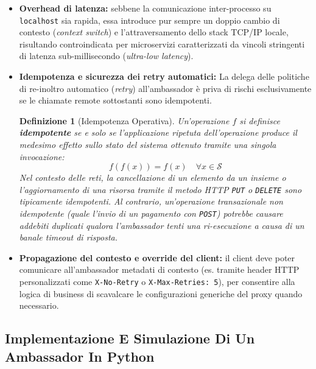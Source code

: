 \documentclass[11pt, a4paper]{article}
\newtheorem{theorem}{Definizione}
\begin{document}
\begin{itemize}[noitemsep]
    \item \textbf{Overhead di latenza:} sebbene la comunicazione inter-processo su \texttt{localhost} sia rapida, essa introduce pur sempre un doppio cambio di contesto (\emph{context switch}) e l'attraversamento dello stack TCP/IP locale, risultando controindicata per microservizi caratterizzati da vincoli stringenti di latenza sub-millisecondo (\emph{ultra-low latency}).
    \item \textbf{Idempotenza e sicurezza dei retry automatici:}
    La delega delle politiche di re-inoltro automatico (\emph{retry}) all'ambassador è priva di rischi esclusivamente se le chiamate remote sottostanti sono idempotenti.

    \begin{theorem}[Idempotenza Operativa]
    Un'operazione $f$ si definisce \textbf{idempotente} se e solo se l'applicazione ripetuta dell'operazione produce il medesimo effetto sullo stato del sistema ottenuto tramite una singola invocazione:
    \[
        f(f(x)) = f(x) \quad \forall x \in \mathcal{S}
    \]
    Nel contesto delle reti, la cancellazione di un elemento da un insieme o l'aggiornamento di una risorsa tramite il metodo HTTP \texttt{PUT} o \texttt{DELETE} sono tipicamente idempotenti. Al contrario, un'operazione transazionale non idempotente (quale l'invio di un pagamento con \texttt{POST}) potrebbe causare addebiti duplicati qualora l'ambassador tenti una ri-esecuzione a causa di un banale timeout di risposta.
    \end{theorem}

    \item \textbf{Propagazione del contesto e override del client:} il client deve poter comunicare all'ambassador metadati di contesto (es. tramite header HTTP personalizzati come \texttt{X-No-Retry} o \texttt{X-Max-Retries: 5}), per consentire alla logica di business di scavalcare le configurazioni generiche del proxy quando necessario.
\end{itemize}

\subsection{Implementazione E Simulazione Di Un Ambassador In Python}
\end{document}
